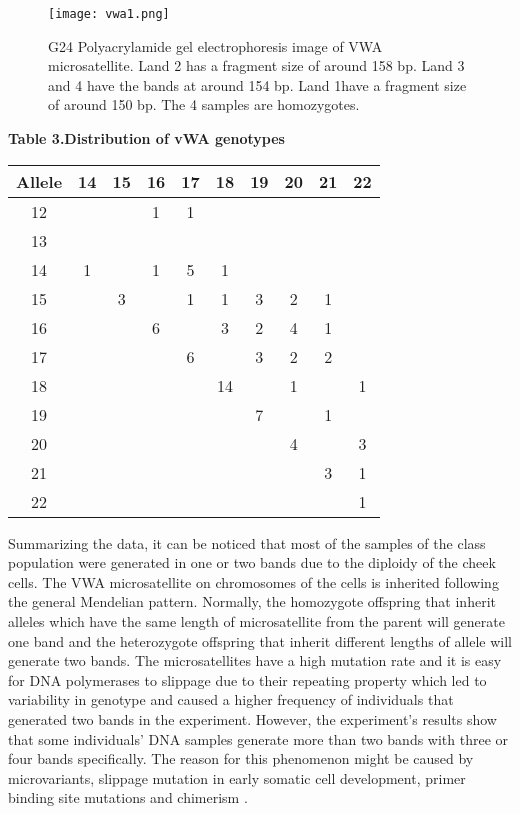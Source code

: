 \documentclass[a4paper,10pt]{article}
\begin{document}
\begin{multicols}{2}
\begin{figure}[H]
\centering
\texttt{[image: vwa1.png]}
\caption{G24 Polyacrylamide gel electrophoresis image of VWA microsatellite. Land 2 has a fragment size of around 158 bp. Land 3 and 4 have the bands at around 154 bp. Land 1have a fragment size of around 150 bp. The 4 samples are homozygotes.} \label{fig2}
\end{figure}


\begin{center}
\textbf{Table 3.Distribution of vWA genotypes}
\vspace{0pt}
\begin{tabular}{c|ccccccccc}
\toprule [1.5pt]
Allele&14&15&16&17&18&19&20&21&22\\
\hline
12&&&1&1&&&&\\
13\\
14&1&&1&5&1\\
15&&3&&1&1&3&2&1&\\
16&&&6&&3&2&4&1\\
17&&&&6&&3&2&2\\
18&&&&&14&&1&&1\\
19&&&&&&7&&1&\\
20&&&&&&&4&&3\\
21&&&&&&&&3&1\\
22&&&&&&&&&1\\
\bottomrule
\end{tabular}
\end{center}


Summarizing the data, it can be noticed that most of the samples of the class population were generated in one or two bands due to the diploidy of the cheek cells. The VWA microsatellite on chromosomes of the cells is inherited following the general Mendelian pattern. Normally, the homozygote offspring that inherit alleles which have the same length of microsatellite from the parent will generate one band and the heterozygote offspring that inherit different lengths of allele will generate two bands. The microsatellites have a high mutation rate and it is easy for DNA polymerases to slippage due to their repeating property which led to variability in genotype and caused a higher frequency of individuals that generated two bands in the experiment. However, the experiment’s results show that some individuals’ DNA samples generate more than two bands with three or four bands specifically. The reason for this phenomenon might be caused by microvariants, slippage mutation in early somatic cell development, primer binding site mutations and chimerism \cite{gavale2024rare}.




\end{multicols}
\end{document}
